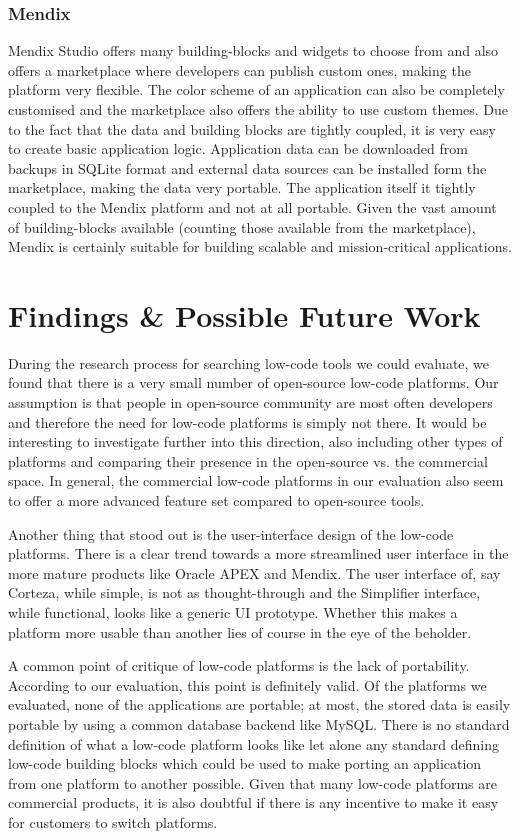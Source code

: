\documentclass[runningheads]{llncs}
\begin{document}
\subsubsection{Mendix}

Mendix Studio offers many building-blocks and widgets to choose from and also offers a marketplace where developers can publish custom ones, making the platform very flexible. The color scheme of an application can also be completely customised and the marketplace also offers the ability to use custom themes. Due to the fact that the data and building blocks are tightly coupled, it is very easy to create basic application logic. Application data can be downloaded from backups in SQLite format and external data sources can be installed form the marketplace, making the data very portable. The application itself it tightly coupled to the Mendix platform and not at all portable. Given the vast amount of building-blocks available (counting those available from the marketplace), Mendix is certainly suitable for building scalable and mission-critical applications.

\section{Findings \& Possible Future Work}
\label{sec:findings}

During the research process for searching low-code tools we could evaluate, we found that there is a very small number of open-source low-code platforms. Our assumption is that people in open-source community are most often developers and therefore the need for low-code platforms is simply not there. It would be interesting to investigate further into this direction, also including other types of platforms and comparing their presence in the open-source vs. the commercial space. In general, the commercial low-code platforms in our evaluation also seem to offer a more advanced feature set compared to open-source tools.

Another thing that stood out is the user-interface design of the low-code platforms. There is a clear trend towards a more streamlined user interface in the more mature products like Oracle APEX and Mendix. The user interface of, say Corteza, while simple, is not as thought-through and the Simplifier interface, while functional, looks like a generic UI prototype. Whether this makes a platform more usable than another lies of course in the eye of the beholder.

A common point of critique of low-code platforms is the lack of portability. According to our evaluation, this point is definitely valid. Of the platforms we evaluated, none of the applications are portable; at most, the stored data is easily portable by using a common database backend like MySQL. There is no standard definition of what a low-code platform looks like let alone any standard defining low-code building blocks which could be used to make porting an application from one platform to another possible. Given that many low-code platforms are commercial products, it is also doubtful if there is any incentive to make it easy for customers to switch platforms.
\end{document}
